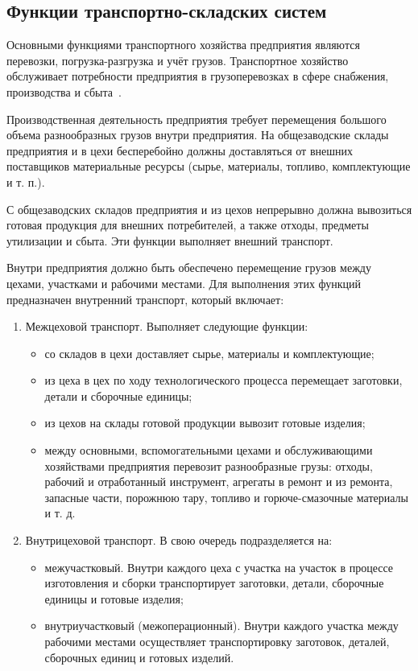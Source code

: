 \subsection{Функции транспортно-складских систем}

Основными функциями транспортного хозяйства предприятия являются перевозки, погрузка-разгрузка и учёт грузов. Транспортное хозяйство обслуживает потребности предприятия в грузоперевозках в сфере снабжения, производства и сбыта~\cite{prok:conspect}.

Производственная деятельность предприятия требует перемещения большого объема разнообразных грузов внутри предприятия. На общезаводские склады предприятия и в цехи бесперебойно должны доставляться от внешних поставщиков материальные ресурсы (сырье, материалы, топливо, комплектующие и т. п.). 

С общезаводских складов предприятия и из цехов непрерывно должна вывозиться готовая продукция для внешних потребителей, а также отходы, предметы утилизации и сбыта. Эти функции выполняет внешний транспорт.

Внутри предприятия должно быть обеспечено перемещение грузов между цехами, участками и рабочими местами. Для выполнения этих функций предназначен внутренний транспорт, который включает:

\begin{enumerate}
    \item Межцеховой транспорт. Выполняет следующие функции:
    \begin{itemize}
        \item со складов в цехи доставляет сырье, материалы и комплектующие;
        \item из цеха в цех по ходу технологического процесса перемещает заготовки, детали и сборочные единицы;
        \item из цехов на склады готовой продукции вывозит готовые изделия;
        \item между основными, вспомогательными цехами и обслуживающими хозяйствами предприятия перевозит разнообразные грузы: отходы, рабочий и отработанный инструмент, агрегаты в ремонт и из ремонта, запасные части, порожнюю тару, топливо и горюче-смазочные материалы и т. д.
    \end{itemize}
    \item Внутрицеховой транспорт. В свою очередь подразделяется на:
        \begin{itemize}
            \item межучастковый. Внутри каждого цеха с участка на участок в процессе изготовления и сборки транспортирует заготовки, детали, сборочные единицы и готовые изделия;
            \item внутриучастковый (межоперационный). Внутри каждого участка между рабочими местами осуществляет транспортировку заготовок, деталей, сборочных единиц и готовых изделий.
        \end{itemize}
\end{enumerate}

